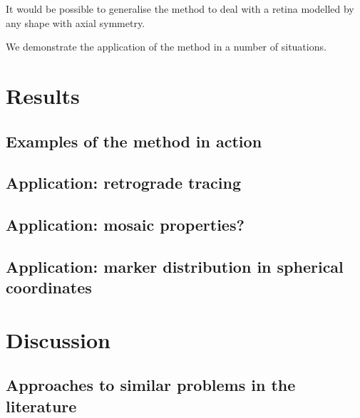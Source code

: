 \documentclass[10pt]{article}
\begin{document}
It would be possible to generalise the method to deal with a retina
modelled by any shape with axial symmetry.


We demonstrate the application of the method in a number of
situations. 


\section*{Results}

\subsection*{Examples of the method in action}


\subsection*{Application: retrograde tracing}


\subsection*{Application: mosaic properties?}


\subsection*{Application: marker distribution in spherical coordinates}


\section*{Discussion}


\subsection*{Approaches to similar problems in the literature}
\label{fold-sphere:sec:appr-simil-probl}
\end{document}
